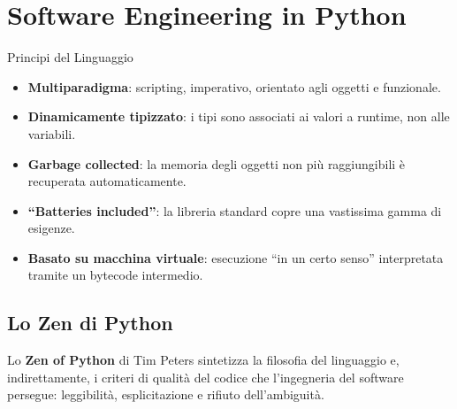 \documentclass[12pt]{extarticle}
\begin{document}
\newpage

\section{Software Engineering in Python}

\begin{cbox}{Principi del Linguaggio}
\begin{itemize}
    \item \textbf{Multiparadigma}: scripting, imperativo, orientato agli oggetti e funzionale.
    \item \textbf{Dinamicamente tipizzato}: i tipi sono associati ai valori a runtime, non alle variabili.
    \item \textbf{Garbage collected}: la memoria degli oggetti non più raggiungibili è recuperata automaticamente.
    \item \textbf{``Batteries included''}: la libreria standard copre una vastissima gamma di esigenze.
    \item \textbf{Basato su macchina virtuale}: esecuzione ``in un certo senso'' interpretata tramite un bytecode intermedio.
\end{itemize}
\end{cbox}

\subsection{Lo Zen di Python}

\noindent Lo \textbf{Zen of Python} di Tim Peters sintetizza la filosofia del linguaggio e, indirettamente, i criteri di qualità del codice che l'ingegneria del software persegue: leggibilità, esplicitazione e rifiuto dell'ambiguità.
\end{document}
